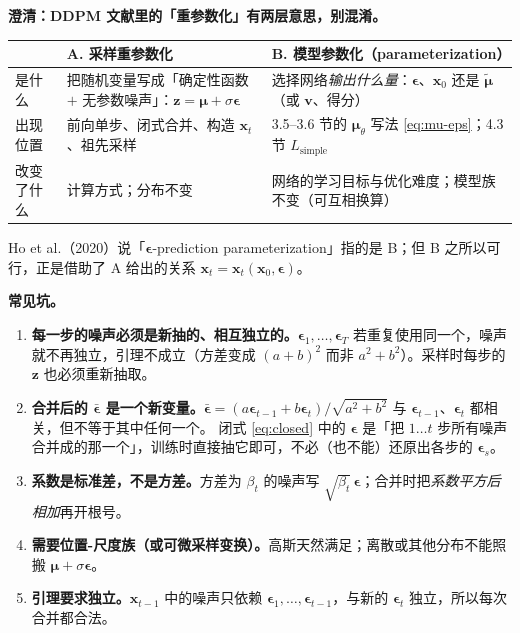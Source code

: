 \documentclass[a4paper,fontset=none,zihao=5]{ctexart}
\numberwithin{equation}{section}
\newcommand{\x}{\mathbf{x}}
\newcommand{\eps}{\boldsymbol{\epsilon}}
\newcommand{\mut}{\tilde{\boldsymbol{\mu}}}
\newcommand{\mutheta}{\boldsymbol{\mu}_\theta}
\newcommand{\Lsimple}{L_{\mathrm{simple}}}
\begin{document}
\begin{notebox}
\textbf{澄清：DDPM 文献里的「重参数化」有两层意思，别混淆。}
\begin{center}
\small
\begin{tabular}{p{}p{}p{}}
  \toprule
  & \textbf{A. 采样重参数化} & \textbf{B. 模型参数化（parameterization）} \\
  \midrule
  是什么 & 把随机变量写成「确定性函数 $+$ 无参数噪声」：$\mathbf{z}=\boldsymbol{\mu}+\sigma\eps$ & 选择网络\emph{输出什么量}：$\eps$、$\x_0$ 还是 $\mut$（或 $\mathbf{v}$、得分） \\
  出现位置 & 前向单步、闭式合并、构造 $\x_t$、祖先采样 & 3.5–3.6 节的 $\mutheta$ 写法 \eqref{eq:mu-eps}；4.3 节 $\Lsimple$ \\
  改变了什么 & 计算方式；分布不变 & 网络的学习目标与优化难度；模型族不变（可互相换算） \\
  \bottomrule
\end{tabular}
\end{center}
Ho et al.（2020）说「$\eps$-prediction parameterization」指的是 B；但 B 之所以可行，正是借助了 A 给出的关系 $\x_t=\x_t(\x_0,\eps)$。
\end{notebox}

\begin{notebox}
\textbf{常见坑。}
\begin{enumerate}[leftmargin=1.6em,itemsep=1pt]
  \item \textbf{每一步的噪声必须是新抽的、相互独立的。}$\eps_1,\dots,\eps_T$ 若重复使用同一个，噪声就不再独立，引理不成立（方差变成 $(a+b)^2$ 而非 $a^2+b^2$）。采样时每步的 $\mathbf{z}$ 也必须重新抽取。
  \item \textbf{合并后的 $\bar{\eps}$ 是一个新变量。}$\bar{\eps}=(a\eps_{t-1}+b\eps_t)/\sqrt{a^2+b^2}$ 与 $\eps_{t-1}$、$\eps_t$ 都相关，但不等于其中任何一个。
        闭式 \eqref{eq:closed} 中的 $\eps$ 是「把 $1\dots t$ 步所有噪声合并成的那一个」，训练时直接抽它即可，不必（也不能）还原出各步的 $\eps_s$。
  \item \textbf{系数是标准差，不是方差。}方差为 $\beta_t$ 的噪声写 $\sqrt{\beta_t}\,\eps$；合并时把\emph{系数平方后相加}再开根号。
  \item \textbf{需要位置-尺度族（或可微采样变换）。}高斯天然满足；离散或其他分布不能照搬 $\boldsymbol{\mu}+\sigma\eps$。
  \item \textbf{引理要求独立。}$\x_{t-1}$ 中的噪声只依赖 $\eps_1,\dots,\eps_{t-1}$，与新的 $\eps_t$ 独立，所以每次合并都合法。
\end{enumerate}
\end{notebox}
\end{document}
